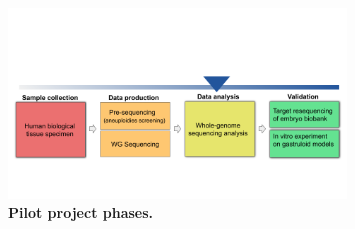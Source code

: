 \begin{figure}[H]
\centering
\includegraphics[width=0.80\textwidth]{fig/projectPhases.png}
\decoRule
\caption{\textbf{Pilot project phases.}} 
\label{fig:projectPhases}
\end{figure}


